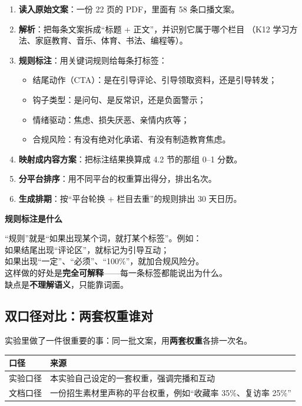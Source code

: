 \documentclass[UTF8,a4paper,11pt]{ctexart}
\newenvironment{explainbox}[1]
{\begin{center}\begin{minipage}{0.94\textwidth}\colorbox{boxbg}{\parbox{0.92\textwidth}{\textbf{#1}\par\vspace{2pt}}}}
{\end{minipage}\end{center}}
\begin{document}
\begin{enumerate}[leftmargin=1.8em]
\item \textbf{读入原始文案}：一份 22 页的 PDF，里面有 58 条口播文案。
\item \textbf{解析}：把每条文案拆成“标题 + 正文”，并识别它属于哪个栏目
      （K12 学习方法、家庭教育、音乐、体育、书法、编程等）。
\item \textbf{规则标注}：用关键词规则给每条打标签：
  \begin{itemize}
  \item 结尾动作（CTA）：是在引导评论、引导领取资料，还是引导转发；
  \item 钩子类型：是问句、是反常识，还是负面警示；
  \item 情绪驱动：焦虑、损失厌恶、亲情内疚等；
  \item 合规风险：有没有绝对化承诺、有没有制造教育焦虑。
  \end{itemize}
\item \textbf{映射成内容方案}：把标注结果换算成 4.2 节的那组 0–1 分数。
\item \textbf{分平台排序}：用不同平台的权重算出得分，排出名次。
\item \textbf{生成排期}：按“平台轮换 + 栏目去重”的规则排出 30 天日历。
\end{enumerate}

\begin{explainbox}{规则标注是什么}
“规则”就是“如果出现某个词，就打某个标签”。例如：\\
如果结尾出现“评论区”，就标记为引导互动；\\
如果出现“一定”、“必须”、“100\%”，就加合规风险分。\\
这样做的好处是\textbf{完全可解释}——每一条标签都能说出为什么。\\
缺点是\textbf{不理解语义}，只能靠词面。
\end{explainbox}

\subsection{双口径对比：两套权重谁对}

实验里做了一件很重要的事：同一批文案，用\textbf{两套权重}各排一次名。

\begin{center}
\begin{tabular}{p{3.2cm}p{10.6cm}}
\toprule
\textbf{口径} & \textbf{来源} \\
\midrule
实验口径 & 本实验自己设定的一套权重，强调完播和互动 \\
文档口径 & 一份招生素材里声称的平台权重，例如“收藏率 35\%、复访率 25\%” \\
\bottomrule
\end{tabular}
\end{center}
\end{document}
